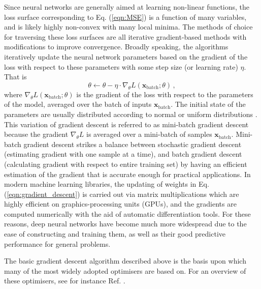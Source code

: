 \documentclass[main.tex]{subfiles}
\begin{document}
    Since neural networks are generally aimed at
    learning non-linear functions, the loss surface
    corresponding to Eq. (\ref{eqn:MSE}) is
    a function of many variables, and is likely highly
    non-convex with many local minima.
    The methods of choice for traversing these loss surfaces
    are all iterative gradient-based methods with modifications
    to improve convergence. Broadly speaking, the algorithms
    iteratively update the neural network parameters based on the
    gradient of the loss with respect to these parameters
    with some step size (or learning rate) $\eta$. That is
    \begin{equation}\label{eqn:gradient_descent}
        \theta \gets \theta - \eta \cdot \nabla_{\theta} L(\mathbf{x}_{\mathrm{batch}}; \theta) \, ,
    \end{equation}
    where $\nabla_{\theta}L(\mathbf{x}_{\mathrm{batch}}; \theta)$ is the
    gradient of the loss with respect to the parameters of the
    model, averaged over the batch of inputs $\mathbf{x}_{\mathrm{batch}}$.
    The initial state of the parameters
    are usually distributed according to normal
    or uniform distributions \cite{pmlr-v9-glorot10a,he_initialiser}.
    This variation of gradient descent is referred to
    as mini-batch gradient descent because the gradient
    $\nabla_{\theta}L$ is averaged over a mini-batch of
    samples $\mathbf{x}_{\mathrm{batch}}$. Mini-batch gradient
    descent strikes a balance between stochastic gradient
    descent (estimating gradient with one sample at a time),
    and batch gradient descent (calculating gradient with
    respect to entire training set) by having an efficient
    estimation of the gradient that is accurate enough
    for practical applications. In modern machine learning
    libraries, the updating of weights in Eq. (\ref{eqn:gradient_descent})
    is carried out via matrix multiplications which are
    highly efficient on graphics-processing units (GPUs),
    and the gradients are computed numerically with the aid
    of automatic differentiation tools. For these reasons, deep
    neural networks have become much more widespread due
    to the ease of constructing and training them, as well
    as their good predictive performance for general problems.

    The basic gradient descent algorithm described above
    is the basis upon which many of the most widely
    adopted optimisers \cite{kiefer1952stochastic,hintonrmsprop,Kingma:2014vow}
    are based on. For an overview of these optimisers, see for instance
    Ref. \cite{Ruder:2016lil}.
\end{document}
